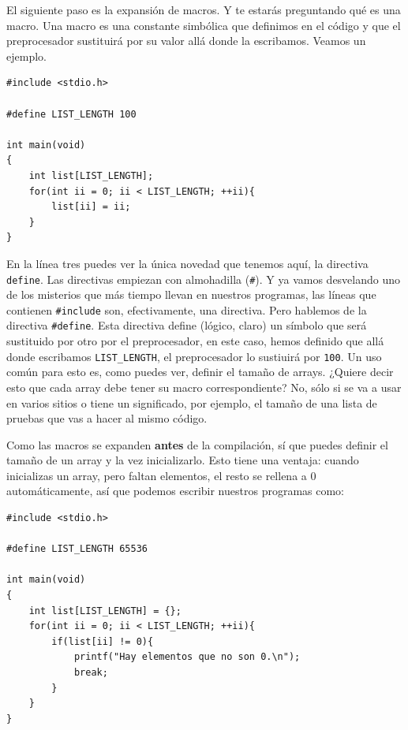 \documentclass[a4paper]{article}
\begin{document}
El siguiente paso es la expansión de macros. Y te estarás
preguntando qué es una macro. Una macro es una constante simbólica que definimos
en el código y que el preprocesador sustituirá por su valor allá donde la
escribamos. Veamos un ejemplo.

\noindent
\begin{minipage}[H]{\linewidth}
\mbox{}
\begin{lstlisting}[style=C,
caption={Creación de macros},
label={lst:defineDirective}]
#include <stdio.h>

#define LIST_LENGTH 100

int main(void)
{
    int list[LIST_LENGTH];
    for(int ii = 0; ii < LIST_LENGTH; ++ii){
        list[ii] = ii;
    }
}
\end{lstlisting}
\end{minipage}


En la línea tres puedes ver la única novedad que tenemos aquí, la directiva
\verb!define!. Las directivas empiezan con almohadilla (\verb!#!). Y ya vamos
desvelando uno de los misterios que más tiempo llevan en nuestros programas, las
líneas que contienen \verb!#include! son, efectivamente, una directiva. Pero
hablemos de la directiva \verb!#define!. Esta directiva define (lógico, claro)
un símbolo que será sustituido por otro por el preprocesador, en este caso,
hemos definido que allá donde escribamos \verb!LIST_LENGTH!, el preprocesador
lo sustiuirá por \verb!100!. Un uso común para esto es, como puedes ver,
definir el tamaño de arrays. ¿Quiere decir esto que cada array debe tener
su macro correspondiente? No, sólo si se va a usar en varios sitios o tiene
un significado, por ejemplo, el tamaño de una lista de pruebas que vas a
hacer al mismo código.

Como las macros se expanden \textbf{antes} de la compilación, sí que puedes
definir el tamaño de un array y la vez inicializarlo. Esto tiene una ventaja:
cuando inicializas un array, pero faltan elementos, el resto se rellena a 0
automáticamente, así que podemos escribir nuestros programas como:

\noindent
\begin{minipage}[H]{\linewidth}
\mbox{}
\begin{lstlisting}[style=C,
caption={Uso de \texttt{define} con arrays},
label={lst:defineArray}]
#include <stdio.h>

#define LIST_LENGTH 65536

int main(void)
{
    int list[LIST_LENGTH] = {};
    for(int ii = 0; ii < LIST_LENGTH; ++ii){
        if(list[ii] != 0){
            printf("Hay elementos que no son 0.\n");
            break;
        }
    }
}
\end{lstlisting}
\end{minipage}
\end{document}

